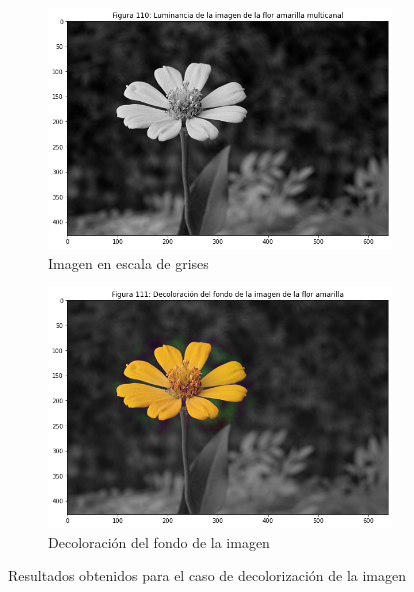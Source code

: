 \documentclass[11pt,twoside,titlepage,a4paper]{article}
\numberwithin{equation}{section} %
\theoremstyle{usual}
\begin{document}
\begin{figure}[h]
    \centering
    \begin{subfigure}[t]{.45\textwidth}
        \centering
        \includegraphics[width=\textwidth]{imagenes/PoissonImageEditing_cell_109_output_0.png}
        \caption{Imagen en escala de grises}
        \label{fig:florGrises}
    \end{subfigure}%
    \centering
    \begin{subfigure}[t]{.45\textwidth}
        \centering
        \includegraphics[width=\textwidth]{imagenes/PoissonImageEditing_cell_109_output_1.png}
        \caption{Decoloración del fondo de la imagen}
        \label{fig:resultadoDecolorizacion}%
    \end{subfigure}
    \caption{Resultados obtenidos para el caso de decolorización de la imagen}
    \label{fig:grisesResultadoDecolorizacion}
\end{figure}
\end{document}
